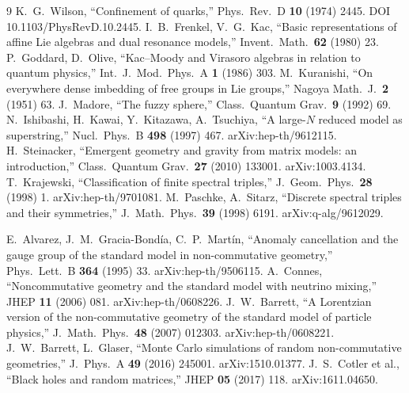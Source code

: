 \begin{thebibliography}{9}
K.~G.~Wilson, ``Confinement of quarks,'' Phys.\ Rev.\ D \textbf{10} (1974) 2445. DOI 10.1103/PhysRevD.10.2445.
I.~B.~Frenkel, V.~G.~Kac, ``Basic representations of affine Lie algebras and dual resonance models,'' Invent.\ Math.\ \textbf{62} (1980) 23.
P.~Goddard, D.~Olive, ``Kac--Moody and Virasoro algebras in relation to quantum physics,'' Int.\ J.\ Mod.\ Phys.\ A \textbf{1} (1986) 303.
M.~Kuranishi, ``On everywhere dense imbedding of free groups in Lie groups,'' Nagoya Math.\ J.\ \textbf{2} (1951) 63.
J.~Madore, ``The fuzzy sphere,'' Class.\ Quantum Grav.\ \textbf{9} (1992) 69.
N.~Ishibashi, H.~Kawai, Y.~Kitazawa, A.~Tsuchiya, ``A large-$N$ reduced model as superstring,'' Nucl.\ Phys.\ B \textbf{498} (1997) 467. arXiv:hep-th/9612115.
H.~Steinacker, ``Emergent geometry and gravity from matrix models: an introduction,'' Class.\ Quantum Grav.\ \textbf{27} (2010) 133001. arXiv:1003.4134.
T.~Krajewski, ``Classification of finite spectral triples,'' J.\ Geom.\ Phys.\ \textbf{28} (1998) 1. arXiv:hep-th/9701081.
M.~Paschke, A.~Sitarz, ``Discrete spectral triples and their symmetries,'' J.\ Math.\ Phys.\ \textbf{39} (1998) 6191. arXiv:q-alg/9612029.

E.~Alvarez, J.~M.~Gracia-Bond\'ia, C.~P.~Mart\'in, ``Anomaly cancellation and the gauge group of the standard model in non-commutative geometry,'' Phys.\ Lett.\ B \textbf{364} (1995) 33. arXiv:hep-th/9506115.
A.~Connes, ``Noncommutative geometry and the standard model with neutrino mixing,'' JHEP \textbf{11} (2006) 081. arXiv:hep-th/0608226.
J.~W.~Barrett, ``A Lorentzian version of the non-commutative geometry of the standard model of particle physics,'' J.\ Math.\ Phys.\ \textbf{48} (2007) 012303. arXiv:hep-th/0608221.
J.~W.~Barrett, L.~Glaser, ``Monte Carlo simulations of random non-commutative geometries,'' J.\ Phys.\ A \textbf{49} (2016) 245001. arXiv:1510.01377.
J.~S.~Cotler et al., ``Black holes and random matrices,'' JHEP \textbf{05} (2017) 118. arXiv:1611.04650.


\end{thebibliography}
